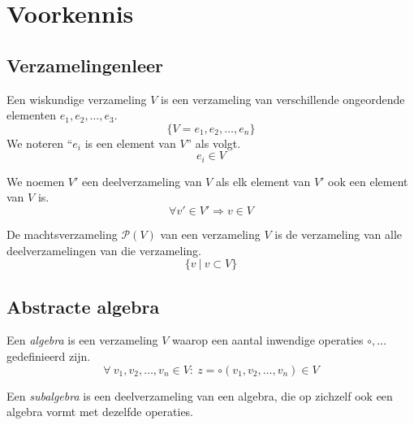 \documentclass[main.tex]{subfiles}
\begin{document}
\chapter{Voorkennis}
\label{cha:voorkennis}

\section{Verzamelingenleer}
\label{sec:verzamelingenleer}

\begin{de}
  Een wiskundige verzameling $V$ is een verzameling van verschillende ongeordende elementen $e_1,e_2,\ldots,e_3$.
  \[ \{V = e_1,e_2,\ldots,e_n\} \]
  We noteren ``$e_i$ is een element van $V$'' als volgt.
  \[ e_i \in V \]
\end{de}

\begin{de}
  We noemen $V'$ een deelverzameling van $V$ als elk element van $V'$ ook een element van $V$ is.
  \[ \forall v' \in V' \Rightarrow v \in V \]
\end{de}

\begin{de}
  De machtsverzameling $\mathcal{P}(V)$ van een verzameling $V$ is de verzameling van alle deelverzamelingen van die verzameling.
  \[ \{v\ |\ v\subset V \}\] 
\end{de}

\section{Abstracte algebra}
\label{sec:abstracte-algebra}

\begin{de}
  Een \emph{algebra} is een verzameling $V$ waarop een aantal inwendige operaties $\circ,\ldots$ gedefinieerd zijn.
  \[ \forall\ v_1,v_2,\ldots,v_n \in V:\ z = \circ(v_1,v_2,\ldots,v_n) \in V \]
\end{de}

\begin{de}
  Een \emph{subalgebra} is een deelverzameling van een algebra, die op zichzelf ook een algebra vormt met dezelfde operaties.
\end{de}
\end{document}
